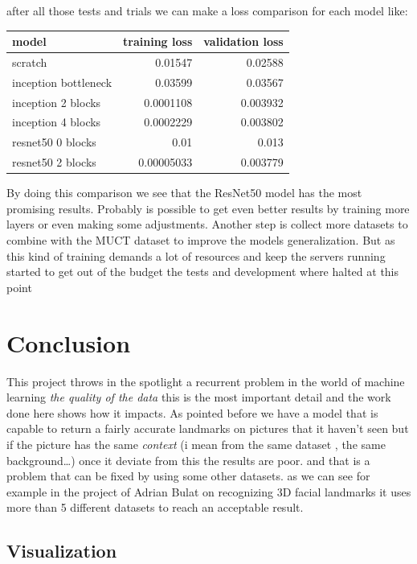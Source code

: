 \documentclass[11pt]{article}
\begin{document}
after all those tests and trials we can make a loss comparison for each model
like:

\begin{center}
\begin{tabular}{lrr}
model & training loss & validation loss\\
\hline
scratch & 0.01547 & 0.02588\\
inception bottleneck & 0.03599 & 0.03567\\
inception 2 blocks & 0.0001108 & 0.003932\\
inception 4 blocks & 0.0002229 & 0.003802\\
resnet50 0 blocks & 0.01 & 0.013\\
resnet50 2 blocks & 0.00005033 & 0.003779\\
\end{tabular}
\end{center}

By doing this comparison we see that the ResNet50 model has the most
promising results.
Probably is possible to get even better results by training more layers or
even making some adjustments.
Another step is collect more datasets to combine with the MUCT dataset to
improve the models generalization.
But as this kind of training demands a lot of resources and keep the servers running started to get out of the budget the
tests and development where halted at this point 

\section{Conclusion}
\label{sec:orgc690ceb}

This project throws in the spotlight a recurrent problem in the world of
machine learning \emph{the quality of the data} this is the most important detail
and the work done here shows how it impacts.
As pointed before we have a model that is capable to return a fairly accurate
landmarks on pictures that it haven't seen but if the picture has the same
\emph{context} (i mean from the same dataset , the same background\ldots{}) once it
deviate from this the results are poor. and that is a problem that can be
fixed by using some other datasets. as we can see for example in the project
of  Adrian Bulat on recognizing 3D facial landmarks \cite{bulat2017far} it uses
more than 5 different datasets to reach an acceptable result.

\subsection{Visualization}
\label{sec:org7bd1ab0}
\end{document}
